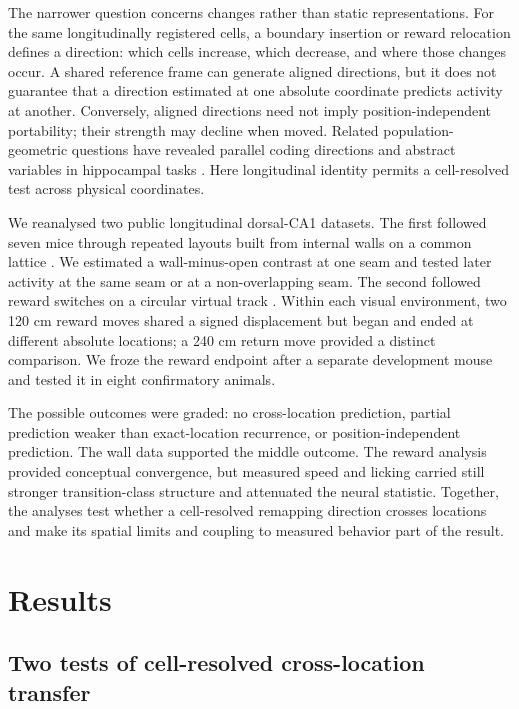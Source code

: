 \documentclass[10pt,twocolumn]{article}
\begin{document}
The narrower question concerns changes rather than static representations.
For the same longitudinally registered cells, a boundary insertion or reward
relocation defines a direction: which cells increase, which decrease, and
where those changes occur. A shared reference frame can generate aligned
directions, but it does not guarantee that a direction estimated at one
absolute coordinate predicts activity at another. Conversely, aligned
directions need not imply position-independent portability; their strength may
decline when moved. Related population-geometric questions have revealed
parallel coding directions and abstract variables in hippocampal tasks
\citep{BernardiEtAl2020,CourellisEtAl2024}. Here longitudinal identity permits a
cell-resolved test across physical coordinates.

We reanalysed two public longitudinal dorsal-CA1 datasets. The first followed
seven mice through repeated layouts built from internal walls on a common
lattice \citep{LeeEtAl2025}. We estimated a wall-minus-open contrast at one
seam and tested later activity at the same seam or at a non-overlapping seam.
The second followed reward switches on a circular virtual track
\citep{SosaEtAl2025}. Within each visual environment, two 120 cm reward moves
shared a signed displacement but began and ended at different absolute
locations; a 240 cm return move provided a distinct comparison. We froze the
reward endpoint after a separate development mouse and tested it in eight
confirmatory animals.

The possible outcomes were graded: no cross-location prediction, partial
prediction weaker than exact-location recurrence, or position-independent
prediction. The wall data supported the middle outcome. The reward analysis
provided conceptual convergence, but measured speed and licking carried still
stronger transition-class structure and attenuated the neural statistic.
Together, the analyses test whether a cell-resolved remapping direction crosses
locations and make its spatial limits and coupling to measured behavior part of
the result.

\section{Results}

\subsection{Two tests of cell-resolved cross-location transfer}
\end{document}
